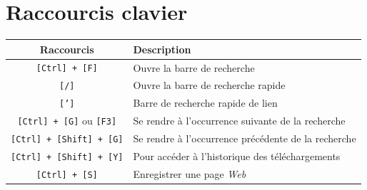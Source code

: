 \documentclass[a4paper,11pt]{book}
\begin{document}
\chapter{Raccourcis clavier}
\begin{center}
\begin{tabular}{|c|l|}
\hline
\textbf{Raccourcis} & \textbf{Description} \\
\hline
\texttt{[Ctrl] + [F]} & Ouvre la barre de recherche \\
\hline
\texttt{[/]} & Ouvre la barre de recherche rapide \\
\hline
\texttt{[']} & Barre de recherche rapide de lien \\
\hline
\texttt{[Ctrl] + [G]} ou \texttt{[F3]} & Se rendre à l’occurrence suivante de la recherche \\
\hline
\texttt{[Ctrl] + [Shift] + [G]} & Se rendre à l’occurrence précédente de la recherche \\
\hline
\texttt{[Ctrl] + [Shift] + [Y]} & Pour accéder à l'historique des téléchargements \\
\hline
\texttt{[Ctrl] + [S]} & Enregistrer une page \textit{Web} \\
\hline
\end{tabular}
\end{center}
\end{document}
